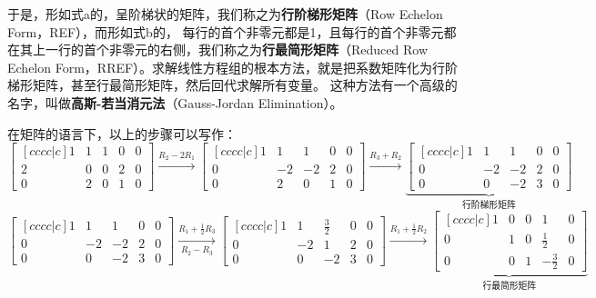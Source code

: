 \documentclass{ctexart}
\begin{document}
于是，形如式a的，呈阶梯状的矩阵，我们称之为\textbf{行阶梯形矩阵}（Row Echelon Form，REF），而形如式b的，
每行的首个非零元都是1，且每行的首个非零元都在其上一行的首个非零元的右侧，我们称之为\textbf{行最简形矩阵}（Reduced Row
Echelon Form，RREF）。求解线性方程组的根本方法，就是把系数矩阵化为行阶梯形矩阵，甚至行最简形矩阵，然后回代求解所有变量。
这种方法有一个高级的名字，叫做\textbf{高斯-若当消元法}（Gauss-Jordan Elimination）。

在矩阵的语言下，以上的步骤可以写作：
\[
    \begin{bmatrix}[cccc|c]
        1 & 1 & 1 & 0 & 0\\
        2 & 0 & 0 & 2 & 0\\
        0 & 2 & 0 & 1 & 0
    \end{bmatrix}
    \xrightarrow{R_{2} - 2R_{1}}
    \begin{bmatrix}[cccc|c]
        1 & 1 & 1 & 0 & 0\\
        0 & -2 & -2 & 2 & 0\\
        0 & 2 & 0 & 1 & 0
    \end{bmatrix}
    \xrightarrow{R_{3} + R_{2}}
    \underbrace{
        \begin{bmatrix}[cccc|c]
            1 & 1 & 1 & 0 & 0\\
            0 & -2 & -2 & 2 & 0\\
            0 & 0 & -2 & 3 & 0
    \end{bmatrix}}_{\text{行阶梯形矩阵}}
\]
\[
    \begin{bmatrix}[cccc|c]
        1 & 1 & 1 & 0 & 0\\
        0 & -2 & -2 & 2 & 0\\
        0 & 0 & -2 & 3 & 0
    \end{bmatrix}
    \xrightarrow[R_{2} - R_{3}]{R_{1} + \frac{1}{2}R_{3}}
    \begin{bmatrix}[cccc|c]
        1 & 1 & \frac{3}{2} & 0 & 0\\
        0 & -2 & 1 & 2 & 0\\
        0 & 0 & -2 & 3 & 0
    \end{bmatrix}
    \xrightarrow{R_{1} + \frac{1}{2}R_{2}}
    \underbrace{
        \begin{bmatrix}[cccc|c]
            1 & 0 & 0 & 1 & 0\\
            0 & 1 & 0 & \frac{1}{2} & 0\\
            0 & 0 & 1 & -\frac{3}{2} & 0
    \end{bmatrix}}_{\text{行最简形矩阵}}
\]
\end{document}
